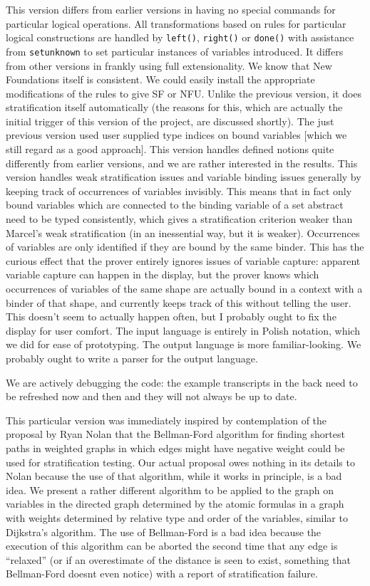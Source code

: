 \documentclass[12pt]{article}
\begin{document}
This version differs from earlier versions in having no special commands for particular logical operations.  All 
transformations based on rules for particular logical constructions are handled by {\tt left()}, {\tt right()} or {\tt done()} with assistance from
{\tt setunknown} to set particular instances of variables introduced.  It differs from other versions in frankly using full extensionality.  We know that New Foundations itself is consistent.  We could easily install the appropriate modifications of the rules to give SF or NFU.  Unlike the previous version, it does stratification itself automatically (the reasons for this, which are actually the initial trigger of this version of the project, are discussed shortly).  The just previous version used user supplied type indices on bound variables [which we still regard as a good approach].  This version handles defined notions quite differently from earlier versions, and we are rather interested in the results.   This version handles weak stratification issues and variable binding issues generally by keeping track of occurrences of variables invisibly.  This means that in fact only bound variables which are connected to the binding variable of a set abstract need to be typed consistently, which gives a stratification criterion weaker than Marcel's weak stratification (in an inessential way, but it is weaker).   Occurrences
of variables are only identified if they are bound by the same binder.  This has the curious effect that the prover entirely ignores issues
of variable capture: apparent variable capture can happen in the display, but the prover knows which occurrences of variables of the same shape are actually bound in a context with a binder of that shape, and currently keeps track of this without telling the user.  This doesn't seem to actually happen often, but I probably ought to fix the display for user comfort.  The input language is entirely in Polish notation,
which we did for ease of prototyping.  The output language is more familiar-looking.  We probably ought to write a parser for the output language.

We are actively debugging the code:  the example transcripts in the back need to be refreshed now and then and they
will not always be up to date.

This particular version was immediately inspired by
contemplation of the proposal by Ryan Nolan that the
Bellman-Ford algorithm for finding shortest paths in weighted
graphs in which edges might have negative weight could be used
for stratification testing. Our actual proposal owes nothing in
its details to Nolan because the use of that algorithm, while it
works in principle, is a bad idea. We present a rather different
algorithm to be applied to the graph on variables in the
directed graph determined by the atomic formulas in a graph with
weights determined by relative type and order of the variables,
similar to Dijkstra's algorithm. The use of Bellman-Ford is a
bad idea because the execution of this algorithm can be aborted
the second time that any edge is ``relaxed'' (or if an
overestimate of the distance is seen to exist, something that
Bellman-Ford doesnt even notice) with a report of stratification
failure.
\end{document}
